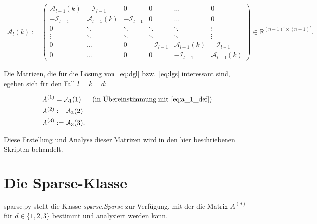 \documentclass[a4paper,10pt,ngerman, oneside,openright]{sphinxmanual}
\begin{document}
\begin{align}
\mathcal{A}_l(k):=
\begin{pmatrix}
\mathcal{A}_{l-1}(k) & -\mathcal{I}_{l-1} & 0 & 0 & \dots & 0\\
-\mathcal{I}_{l-1} & \mathcal{A}_{l-1}(k) & -\mathcal{I}_{l-1} & 0 & \dots & 0\\
0 & \ddots & \ddots & \ddots & \ddots & \vdots \\
\vdots & \ddots & \ddots & \ddots & \ddots & \vdots \\
0 & \dots & 0 & -\mathcal{I}_{l-1} & \mathcal{A}_{l-1}(k) & -\mathcal{I}_{l-1} \\
0 & \dots & 0 & 0 & -\mathcal{I}_{l-1} & \mathcal{A}_{l-1}(k)
\end{pmatrix} \in \mathbb{R}^{(n-1)^l\times(n-1)^l}.
\end{align}

Die Matrizen, die für die Lösung von~\eqref{eq:dgl}  bzw.~\eqref{eq:lgs} interessant sind, egeben sich für den Fall $l=k=d$:

\begin{align}
A^{(1)}&=\mathcal{A}_1(1)\text{~~~~~(in Übereinstimmung mit \eqref{eq:a_1_def})}\\
A^{(2)}&:=\mathcal{A}_2(2)\\
A^{(3)}&:=\mathcal{A}_3(3).
\end{align}

Diese Erstellung und Analyse dieser Matrizen wird in den hier beschriebenen Skripten behandelt.

\chapter{Die Sparse-Klasse}
\label{\detokenize{index:welcome-to-schnittstellendokumentation-serie-2-s-documentation}}\label{\detokenize{index:module-sparse}}\label{\detokenize{index:die-sparse-klasse}}
sparse.py stellt die Klasse \emph{sparse.Sparse} zur Verfügung, mit der die Matrix $A^{(d)}$ für $d\in\{1,2,3\}$
bestimmt und analysiert werden kann.
\end{document}
